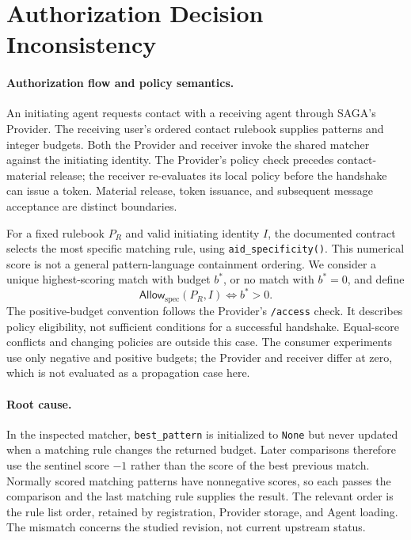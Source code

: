 \section{Authorization Decision Inconsistency}
\label{sec:authorization-inconsistency}

\paragraph{Authorization flow and policy semantics.}
An initiating agent requests contact with a receiving agent through SAGA's
Provider. The receiving user's ordered contact rulebook supplies patterns
and integer budgets. Both the Provider and receiver invoke the shared
matcher against the initiating identity. The Provider's policy check
precedes contact-material release; the receiver re-evaluates its local
policy before the handshake can issue a token. Material release, token
issuance, and subsequent message acceptance are distinct boundaries.

For a fixed rulebook $P_R$ and valid initiating identity $I$, the documented
contract selects the most specific matching rule, using
\texttt{aid\_specificity()}. This numerical score is not a general
pattern-language containment ordering. We consider a unique highest-scoring
match with budget $b^*$, or no match with $b^*=0$, and define
\[
  \mathsf{Allow}_{\mathrm{spec}}(P_R,I)
  \Longleftrightarrow b^*>0.
\]
The positive-budget convention follows the Provider's \texttt{/access}
check. It describes policy eligibility, not sufficient conditions for a
successful handshake. Equal-score conflicts and changing policies are
outside this case. The consumer experiments use only negative and positive
budgets; the Provider and receiver differ at zero, which is not evaluated
as a propagation case here.

\paragraph{Root cause.}
In the inspected matcher, \texttt{best\_pattern} is initialized to
\texttt{None} but never updated when a matching rule changes the returned
budget. Later comparisons therefore use the sentinel score $-1$ rather
than the score of the best previous match. Normally scored matching
patterns have nonnegative scores, so each passes the comparison and the
last matching rule supplies the result. The relevant order is the rule
list order, retained by registration, Provider storage, and Agent loading.
The mismatch concerns the studied revision, not current upstream status.

